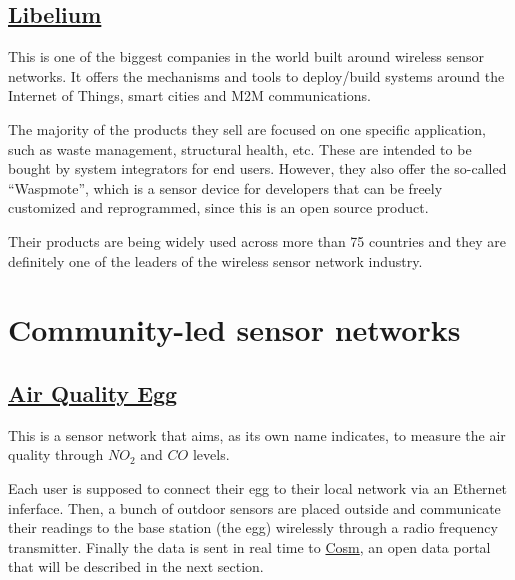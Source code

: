 %
%

\subsection{\href{http://www.libelium.com/}{Libelium}}

This is one of the biggest companies in the world built around wireless sensor networks. It offers the mechanisms and tools to deploy/build systems around the Internet of Things, smart cities and M2M communications.

The majority of the products they sell are focused on one specific application, such as waste management, structural health, etc. These are intended to be bought by system integrators for end users. However, they also offer the so-called ``Waspmote'', which is a sensor device for developers that can be freely customized and reprogrammed, since this is an open source product.

Their products are being widely used across more than 75 countries and they are definitely one of the leaders of the wireless sensor network industry.


\section{Community-led sensor networks}

%
%

\subsection{\href{http://www.aiqualityegg.com}{Air Quality Egg}}

This is a sensor network that aims, as its own name indicates, to measure the air quality through $NO_{2}$ and $CO$ levels.

Each user is supposed to connect their egg to their local network via an Ethernet inferface. Then, a bunch of outdoor sensors are placed outside and communicate their readings to the base station (the egg) wirelessly through a radio frequency transmitter. Finally the data is sent in real time to \href{http://www.cosm.com}{Cosm}, an open data portal that will be described in the next section.

